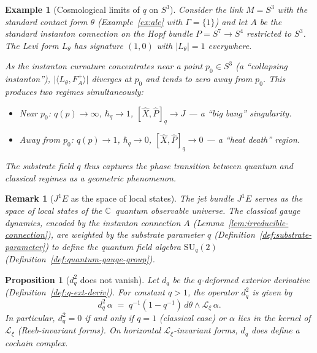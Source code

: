 \documentclass[12pt,a4paper]{report}
\newtheorem{proposition}[theorem]{Proposition}
\newtheorem{example}[theorem]{Example}
\newtheorem{remark}[theorem]{Remark}
\begin{document}
\begin{example}[Cosmological limits of $q$ on $S^3$]
\label{ex:cosmological-limits}
Consider the link $M = S^3$ with the standard contact form
$\theta$ (Example~\ref{ex:ale} with $\Gamma = \{1\}$) and let
$A$ be the standard instanton connection on the Hopf bundle
$P = S^7 \to S^4$ restricted to $S^3$.  The Levi form $L_\theta$
has signature $(1,0)$ with $\lvert L_\theta \rvert = 1$ everywhere.

As the instanton curvature concentrates near a point $p_0 \in S^3$
(a ``collapsing instanton''),
$\lvert \langle L_\theta, F_A^+ \rangle \rvert$ diverges at $p_0$ and
tends to zero away from $p_0$.  This produces two regimes simultaneously:
\begin{itemize}
  \item \emph{Near $p_0$}: $q(p) \to \infty$, $\hbar_q \to 1$,
        $[\hat{X},\hat{P}]_q \to J$ --- a ``big bang'' singularity.
  \item \emph{Away from $p_0$}: $q(p) \to 1$, $\hbar_q \to 0$,
        $[\hat{X},\hat{P}]_q \to 0$ --- a ``heat death'' region.
\end{itemize}
The substrate field $q$ thus captures the phase transition between
quantum and classical regimes as a geometric phenomenon.
\end{example}

\begin{remark}[$J^1E$ as the space of local states]
\label{rem:j1e-local-states}
The jet bundle $J^1 E$ serves as the space of local states of the
$\mathbb{C}$~quantum observable universe.  The classical gauge dynamics,
encoded by the \emph{instanton connection} $A$
(Lemma~\ref{lem:irreducible-connection}), are weighted by the substrate
parameter $q$ (Definition~\ref{def:substrate-parameter}) to define the
quantum field algebra $\mathrm{SU}_q(2)$
(Definition~\ref{def:quantum-gauge-group}).
\end{remark}

\begin{proposition}[$d_q^2$ does not vanish]
\label{prop:dq-squared}
Let $d_q$ be the $q$-deformed exterior derivative
(Definition~\ref{def:q-ext-deriv}).  For constant $q > 1$, the operator
$d_q^2$ is given by
\[
  d_q^2\,\alpha
  \;=\; q^{-1}(1 - q^{-1})\,d\theta \wedge \mathcal{L}_\xi\,\alpha.
\]
In particular, $d_q^2 = 0$ if and only if $q = 1$ (classical case) or
$\alpha$ lies in the kernel of $\mathcal{L}_\xi$ (Reeb-invariant forms).
On horizontal $\mathcal{L}_\xi$-invariant forms, $d_q$ \emph{does}
define a cochain complex.
\end{proposition}
\end{document}
